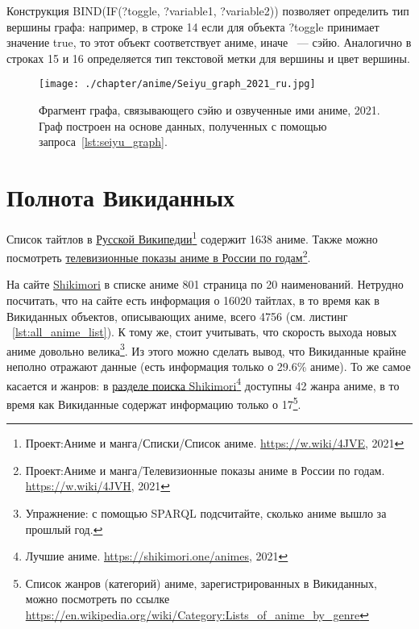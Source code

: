 Конструкция BIND(IF(?toggle, ?variable1, ?variable2)) позволяет определить тип вершины графа: например, в строке 14 если для объекта ?toggle принимает значение true, то этот объект соответствует аниме, иначе ~--- сэйю. Аналогично в строках 15 и 16 определяется тип текстовой метки для вершины и цвет вершины.

\newpage
\begin{fullwidth}
\begin{figure*}[h]
	\texttt{[image: ./chapter/anime/Seiyu\_graph\_2021\_ru.jpg]}
	\caption[Фрагмент графа, связывающего сэйю и озвученные ими аниме, 2021.]{Фрагмент графа, связывающего сэйю и озвученные ими аниме, 2021. Граф построен на основе данных, полученных с помощью запроса~\protect\ref{lst:seiyu_graph}.}%
      \label{fig:Seiyu_graph_2021_ru}%
\end{figure*} 
\end{fullwidth}

\section{Полнота Викиданных}

Список тайтлов в \href{https://w.wiki/4JVE}{Русской Википедии}\footnote{Проект:Аниме и манга/Списки/Список аниме. \href{https://w.wiki/4JVE}{https://w.wiki/4JVE}, 2021} содержит \num{1638} аниме. Также можно посмотреть \href{https://w.wiki/4JVH}{телевизионные показы аниме в России по годам}\footnote{Проект:Аниме и манга/Телевизионные показы аниме в России по годам. \href{https://w.wiki/4JVH}{https://w.wiki/4JVH}, 2021}.

На сайте \href{https://shikimori.one/}{Shikimori}\cite{shikimori} в списке аниме \num{801} страница по \num{20} наименований. Нетрудно посчитать, что на сайте есть информация о \num{16020} тайтлах, в то время как в Викиданных объектов, описывающих аниме, всего \num{4756} (см. листинг ~\protect\ref{lst:all_anime_list}). К тому же, стоит учитывать, что скорость выхода новых аниме довольно велика\footnote{Упражнение: с помощью SPARQL подсчитайте, сколько аниме вышло за прошлый год.}. Из этого можно сделать вывод, что Викиданные крайне неполно отражают данные (есть информация только о \num{29.6}\% аниме). То же самое касается и жанров: в \href{https://shikimori.one/animes}{разделе поиска Shikimori}\footnote{Лучшие аниме. \href{https://shikimori.one/animes}{https://shikimori.one/animes}, 2021} доступны \num{42} жанра аниме, в то время как Викиданные содержат информацию только о \num{17}\footnote{Список жанров (категорий) аниме, зарегистрированных в Викиданных, можно посмотреть по ссылке \href{https://en.wikipedia.org/wiki/Category:Lists\_of_anime\_by\_genre}{https://en.wikipedia.org/wiki/Category:Lists\_of\_anime\_by\_genre}}.

